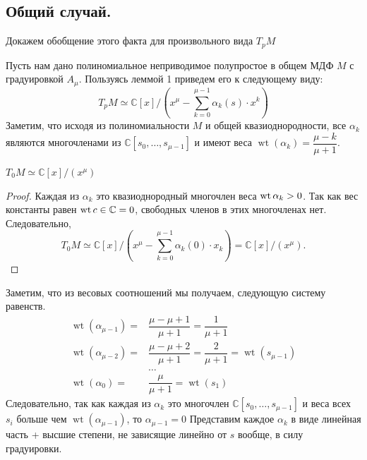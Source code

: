 \subsection{Общий случай.}
Докажем обобщение этого факта для произвольного вида \(T_pM\)
\par
Пусть нам дано полиномиальное неприводимое полупростое в общем МДФ \(M\) с градуировкой \(A_\mu\). Пользуясь леммой 1 приведем его к следующему виду:
\[
T_pM \simeq \mathbb{C}[x]/\left(x^{\mu} - \sum_{k = 0}^{\mu - 1}\alpha_k (s)\cdot x^k\right)
\]
Заметим, что исходя из полиномиальности \(M\) и общей квазиоднородности, все \(\alpha_k\) являются многочленами из \(\mathbb{C}[s_0, \dots, s_{\mu-1}]\) и имеют веса \(\operatorname{wt}(\alpha_k) = \dfrac{\mu - k}{\mu + 1}\).\par 
\begin{lem}\label{lem2}
	\(T_0M \simeq \mathbb C[x]/(x^\mu)\)
\end{lem}
\begin{proof}
	Каждая из \(\alpha_{k}\) это квазиоднородный многочлен веса \(\operatorname{wt}{\alpha_{k}} > 0\). Так как вес  константы равен \(\operatorname{wt}{c \in \mathbb{C}} = 0\), свободных членов в этих многочленах нет. Следовательно, \[T_0M \simeq \mathbb{C}[x]/\left(x^{\mu} - \sum_{k = 0}^{\mu - 1}\alpha_k (0)\cdot x_k\right) = \mathbb C[x]/(x^\mu).\]
\end{proof}
\iffalse
Заметим, что из весовых соотношений мы получаем, следующую систему равенств.
\begin{align*}
	\operatorname{wt}(\alpha_{\mu - 1}) = & \dfrac{\mu - \mu + 1}{\mu + 1} = \dfrac{1}{\mu + 1}\\
	\operatorname{wt}(\alpha_{\mu - 2}) = & \dfrac{\mu - \mu + 2}{\mu + 1} = \dfrac{2}{\mu + 1} = \operatorname{wt}(s_{\mu - 1})\\
	&\dots\\
	\operatorname{wt}(\alpha_{0}) = & \dfrac{\mu}{\mu + 1} = \operatorname{wt}(s_{1})
\end{align*}
Следовательно, так как каждая из \(\alpha_k\) это многочлен \(\mathbb{C}[s_0, \dots, s_{\mu-1}]\) и веса всех \(s_i\) больше чем \(\operatorname{wt}(\alpha_{\mu - 1})\), то \(\alpha_{\mu - 1} = 0\) Представим каждое \(\alpha_k\) в виде линейная часть + высшие степени, не зависящие линейно от \(s\) вообще, в силу градуировки.

